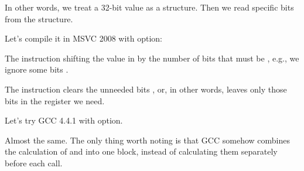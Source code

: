 In other words, we treat a 32-bit \Tint value as a structure.
Then we read specific bits from the structure.


Let's compile it in MSVC 2008 with \Ox option:




The  instruction shifting the value in \EAX by the number of bits that must be
, e.g., we ignore some bits .


The \AND instruction clears the unneeded bits , or, in other words, 
leaves only those bits in the \EAX register we need.




Let's try GCC 4.4.1 with \Othree option.



Almost the same.
The only thing worth noting is that GCC somehow combines the calculation of
 and  into one block,
instead of calculating them separately before each \printf call.

